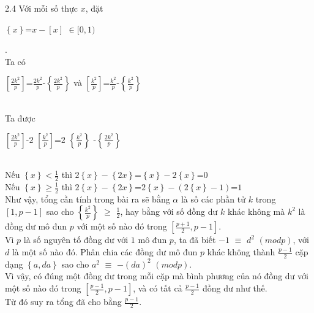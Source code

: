 \begin{Answer}{2.4}
Với mỗi số thực $x$, đặt\\
\centerline {$\left\{x\right\}$=$x-\left[x\right]$ $\in [0,1)$}.\\
Ta có\\
 \centerline{$\left[\frac{2k^2}{p}\right]$=$\frac{2k^2}{p}$-$\left\{\frac{2k^2}{p}\right\}$ và
$\left[\frac{k^2}{p}\right]$=$\frac{k^2}{p}$-$\left\{\frac{k^2}{p}\right\}$}\\
Ta được\\
\centerline {$\left[\frac{2k^2}{p}\right]$-$2$ $\left[\frac{k^2}{p}\right]$=$2$ $\left\{\frac{k^2}{p}\right\}$
-$\left\{\frac{2k^2}{p}\right\}$}\\
Nếu ${\left\{x\right\}<\frac{1}{2}}$    thì    ${2\left\{x\right\}-\left\{2x\right\}}$=${\left\{x\right\}-2\left\{x\right\}}$=$0$\\
Nếu $\left\{x\right\}\geq\frac{1}{2}$     thì   ${2\left\{x\right\}-\left\{2x\right\}}$=$2{\left\{x\right\}-(2\left\{x\right\}-1)}$=$1$\\
Như vậy, tổng cần tính trong bài ra sẽ bằng $\alpha$ là số các phần tử $k$ trong $\left[1, p-1\right]$ sao cho
$\left\{\frac{k^2}{p}\right\}$ $\geq$ $\frac{1}{2}$, hay bằng với số đồng dư $k$ khác không mà $k^2$ là đồng dư mô
đun $p$ với một số nào đó trong $\left[\frac{p+1}{2}, p-1\right]$.\\
Vì $p$ là số nguyên tố đồng dư với $1$ mô đun $p$, ta đã biết $-1$ $\equiv$ $d^2$ $(mod p)$, với $d$ là một số nào đó.
Phân chia các đồng dư mô đun $p$ khác không thành $\frac{p-1}{2}$ cặp dạng $\left\{a, da\right\}$ sao cho
 $a^2$ $\equiv$ $-(da)^2$ $(modp)$.\\
Vì vậy, có đúng một đồng dư trong mỗi cặp mà bình phương của nó đồng dư với một số nào đó trong
$\left[\frac{p-1}{2}, p-1\right]$, và có tất cả $\frac{p-1}{2}$ đồng dư như thế.\\
Từ đó suy ra tổng đã cho bằng $\frac{p-1}{2}$.
\end{Answer}
